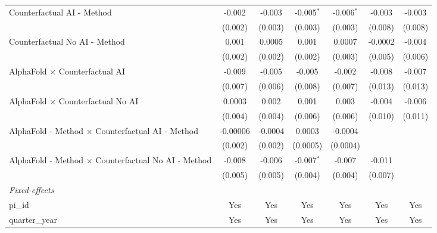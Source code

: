 \begin{tabular}{lcccccc}
   Counterfactual AI - Method                                 & -0.002       & -0.003       & -0.005$^{*}$ & -0.006$^{*}$ & -0.003  & -0.003\\   
                                                              & (0.002)      & (0.003)      & (0.003)      & (0.003)      & (0.008) & (0.008)\\   
   Counterfactual No AI - Method                              & 0.001        & 0.0005       & 0.001        & 0.0007       & -0.0002 & -0.004\\   
                                                              & (0.002)      & (0.002)      & (0.002)      & (0.003)      & (0.005) & (0.006)\\   
   AlphaFold $\times$ Counterfactual AI                       & -0.009       & -0.005       & -0.005       & -0.002       & -0.008  & -0.007\\   
                                                              & (0.007)      & (0.006)      & (0.008)      & (0.007)      & (0.013) & (0.013)\\   
   AlphaFold $\times$ Counterfactual No AI                    & 0.0003       & 0.002        & 0.001        & 0.003        & -0.004  & -0.006\\   
                                                              & (0.004)      & (0.004)      & (0.006)      & (0.006)      & (0.010) & (0.011)\\   
   AlphaFold - Method $\times$ Counterfactual AI - Method     & -0.00006     & -0.0004      & 0.0003       & -0.0004      &         &   \\   
                                                              & (0.002)      & (0.002)      & (0.0005)     & (0.0004)     &         &   \\   
   AlphaFold - Method $\times$ Counterfactual No AI - Method  & -0.008       & -0.006       & -0.007$^{*}$ & -0.007       & -0.011  &   \\   
                                                              & (0.005)      & (0.005)      & (0.004)      & (0.004)      & (0.007) &   \\   
   \midrule
   \emph{Fixed-effects}\\
   pi\_id                                                     & Yes          & Yes          & Yes          & Yes          & Yes     & Yes\\  
   quarter\_year                                              & Yes          & Yes          & Yes          & Yes          & Yes     & Yes\\  

\end{tabular}
